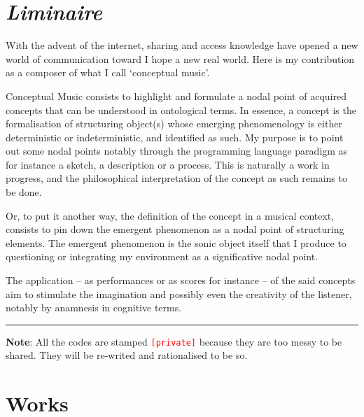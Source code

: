 \chapter*{\textsl{Liminaire}}

\thispagestyle{empty}

\bigskip

With the advent of the internet, sharing and access knowledge have opened a new world of communication toward I hope a new real world. Here is my contribution as a composer of what I call `conceptual music'.						
\bigskip

Conceptual Music consists to highlight and formulate a nodal point of acquired concepts that can be understood in ontological terms. In essence, a concept is the formalisation of structuring object(s) whose emerging phenomenology is either deterministic or indeterministic, and identified as such. My purpose is to point out some nodal points notably through the programming language paradigm as for instance a sketch, a description or a process. This is naturally a work in progress, and the philosophical interpretation of the concept as such remains to be done.						

Or, to put it another way, the definition of the concept in a musical context, consists to pin down the emergent phenomenon as a nodal point of structuring elements. The emergent phenomenon is the sonic object itself that I produce to questioning or integrating my environment as a significative nodal point.

\bigskip
 
The application -- as performances or as scores for instance -- of the said concepts aim to stimulate the imagination and possibly even the creativity of the listener, notably by anamnesis in cognitive terms.										

\bigskip

\begin{center}\rule{0.5\linewidth}{0.5pt}\end{center}

\bigskip
\bigskip

\textbf{Note}: All the codes are stamped \texttt{\textcolor{red}{\small[private]}} because they are too messy to be shared. They will be re-writed and rationalised to be so.
\newpage

\chapter*{Works}


